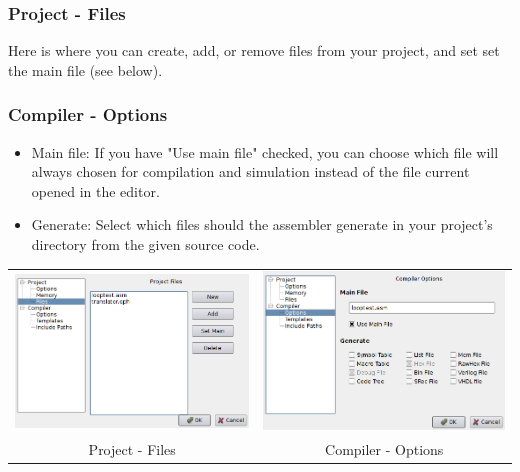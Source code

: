     \subsubsection{Project - Files}
        Here is where you can create, add, or remove files from your project, and set set the main file (see below).

    \clearpage

    \subsubsection{Compiler - Options}
            \begin{itemize}
                \item Main file: If you have "Use main file" checked, you can choose which file will always chosen for
                      compilation and simulation instead of the file current opened in the editor.
                \item Generate: Select which files should the assembler generate in your project's directory from the
                      given source code.
            \end{itemize}

        \begin{table}[h!]
            \begin{tabular}{cc}
                \includegraphics[width=.5\textwidth]{img/config3.png}
                    &
                \includegraphics[width=.5\textwidth]{img/config4.png}
                    \\
                Project - Files & Compiler - Options
            \end{tabular}
        \end{table}

